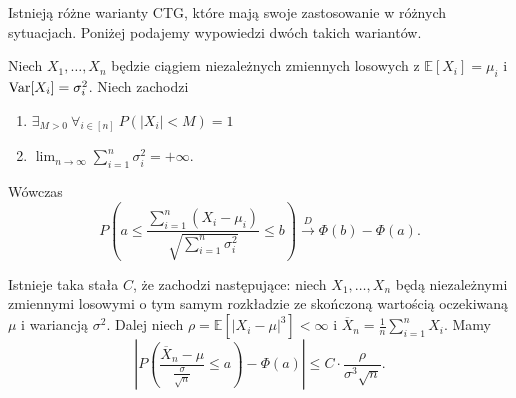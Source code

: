 Istnieją różne warianty CTG, które mają swoje zastosowanie w różnych sytuacjach. Poniżej podajemy wypowiedzi dwóch takich wariantów.

\begin{theorem}
    Niech \(X_1,\ldots,X_n\) będzie ciągiem niezależnych zmiennych losowych z \(\mathbb{E}\left[ X_i \right] = \mu_i\) i \(\variance{X_i} = \sigma_i^2\). Niech zachodzi
    \begin{enumerate}
        \item \(\exists_{M>0} \ \forall_{i \in [n]} \ P\left( \left|X_i\right|<M \right) = 1 \)
        \item \( \lim_{n \to \infty} \sum_{i=1}^{n} \sigma_i^2 = +\infty\).
    \end{enumerate}
    Wówczas \[ P\left( a \le \frac{ \sum_{i=1}^{n} \left( X_i - \mu_i \right) }{\sqrt{ \sum_{i=1}^{n} \sigma_i^2} } \le  b  \right) \xrightarrow{D} \Phi\left( b  \right) - \Phi\left( a  \right) . \] 
\end{theorem}

\begin{theorem}
    Istnieje taka stała \(C\), że zachodzi następujące: niech \(X_1,\ldots,X_n\) będą niezależnymi zmiennymi losowymi o tym samym rozkładzie ze skończoną wartością oczekiwaną \(\mu\) i wariancją \(\sigma^2\). Dalej niech \(\rho = \mathbb{E}\left[ \left|X_i-\mu\right|^3 \right] < \infty \) i \(\overline{X}_{n} = \frac{1}{n} \sum_{i=1}^{n} X_i\). Mamy
    \[ \left|P\left( \frac{\overline{X}_{n}-\mu}{\frac{\sigma}{\sqrt{n} }} \le a \right) - \Phi\left( a  \right) \right| \le C\cdot \frac{\rho}{\sigma^3 \sqrt{n} } .\] 
\end{theorem}

